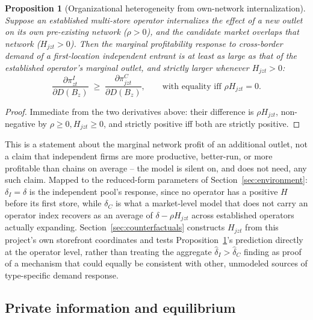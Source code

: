 \documentclass[english,12pt]{article}
\newtheorem{proposition}{Proposition}
\begin{document}
\begin{proposition}[Organizational heterogeneity from own-network internalization]
\label{prop:cannibalization}
Suppose an established multi-store operator internalizes the effect of a new outlet on its own pre-existing network ($\rho>0$), and the candidate market overlaps that network ($H_{jzt}>0$). Then the marginal profitability response to cross-border demand of a first-location independent entrant is at least as large as that of the established operator's marginal outlet, and strictly larger whenever $H_{jzt}>0$:
\[
\frac{\partial \pi^I_{zt}}{\partial D(B_z)} \;\ge\; \frac{\partial \pi^C_{jzt}}{\partial D(B_z)}, \qquad \text{with equality iff } \rho H_{jzt}=0.
\]
\end{proposition}
\begin{proof}
Immediate from the two derivatives above: their difference is $\rho H_{jzt}$, non-negative by $\rho\ge0, H_{jzt}\ge0$, and strictly positive iff both are strictly positive.
\end{proof}

This is a statement about the marginal network profit of an additional outlet, not a claim that independent firms are more productive, better-run, or more profitable than chains on average -- the model is silent on, and does not need, any such claim. Mapped to the reduced-form parameters of Section~\ref{sec:environment}: $\delta_I=\delta$ is the independent pool's response, since no operator has a positive $H$ before its first store, while $\delta_C$ is what a market-level model that does not carry an operator index recovers as an average of $\delta-\rho H_{jzt}$ across established operators actually expanding. Section~\ref{sec:counterfactuals} constructs $H_{jzt}$ from this project's own storefront coordinates and tests Proposition~\ref{prop:cannibalization}'s prediction directly at the operator level, rather than treating the aggregate $\hat\delta_I>\hat\delta_C$ finding as proof of a mechanism that could equally be consistent with other, unmodeled sources of type-specific demand response.

\subsection{Private information and equilibrium}
\label{sec:equilibrium}
\end{document}

